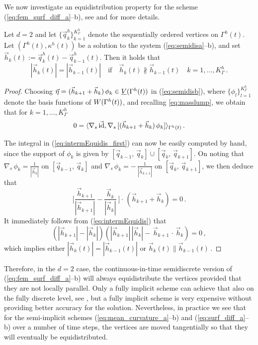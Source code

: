 We now investigate an equidistribution property for the scheme
(\ref{eq:fem_surf_diff_a}--b), see \cite[Remark~2.4]{triplej} and
\cite[Theorem~3.2]{NurnbergS14} for more details.
\begin{theorem}\label{thm:equidistribution_property}
Let $d = 2$ and let $\{ \vec q_k^h \}_{k = 1}^{K_{\Gamma}^h}$ denote the
sequentially ordered vertices on $\Gamma^h(t)$. Let
$( \Gamma^h(t), \kappa^h(t) )$
be a solution to the system (\ref{eq:semidisa}--b), and set
$\vec h_k(t) := \vec q^h_k(t) - \vec q^h_{k - 1}(t)$.
Then it holds that
\begin{equation}\label{eq:equidistribSemidis}
|\vec h_k(t)| = |\vec h_{k - 1}(t)| \quad \mbox{if} \quad
\vec h_k(t) \nparallel \vec h _{k - 1}(t) \quad k = 1, \ldots, K_{\Gamma}^h \, .
\end{equation}
\end{theorem}
\begin{proof}
Choosing $\vec \eta = (\vec h_{k + 1} + \vec h_k) \, \phi_k \in \underline{V}(\Gamma^h(t))$ in
(\ref{eq:semidisb}), where $\{ \phi_l \}_{l = 1}^{K_{\Gamma}^h}$ denote the
basis functions of $W(\Gamma^h(t))$, and recalling \ref{eq:masslump}, we obtain that for
$k = 1,\ldots,K_{\Gamma}^h$
\begin{equation}\label{eq:intermEquidis_first}
0 = \langle \nabla_s \, \vec {\rm id}, \nabla_s \, [ (\vec h_{k + 1} + \vec h_k)
\, \phi_k ] \rangle_{\Gamma^h(t)}\, .
\end{equation}

The integral in (\ref{eq:intermEquidis_first}) can now be easily computed by
hand, since the support of $\phi_k$ is given by $[\vec q_{k - 1}, \, \vec q_k]
\cup [\vec q_k, \, \vec q_{k + 1}]$. On noting that
$\nabla_s \, \phi_k = \frac{1}{|\vec h_k|}$ on $[\vec q_{k - 1}, \, \vec q_k]$
and $\nabla_s \, \phi_k = - \, \frac{1}{|\vec h_{k + 1}|}$ on $[\vec q_k, \,
\vec q_{k + 1}]$, we then deduce that
\begin{equation}\label{eq:intermEquidis}
\Big [ \frac{\vec h_{k + 1}}{|\vec h_{k + 1}|} -\frac{\vec h_k}{|\vec h_k|}
\ \Big ] \cdot \, (\vec h_{k + 1} + \vec h_k) = 0 \, .
\end{equation}
It immediately follows from (\ref{eq:intermEquidis}) that
\begin{equation}\label{eq:TM}
(|\vec h_{k + 1}| - |\vec h_k|) (|\vec h_{k + 1}| \, |\vec h_k|
- \, \vec h_{k + 1} \, \cdot \, \vec h_k) = 0 \, ,
\end{equation}
which implies either $|\vec h_k(t)| = |\vec h_{k - 1}(t)| $ or
$\vec h_k(t) \parallel \vec h _{k - 1}(t)\,.$
\end{proof}
Therefore, in the $d=2$ case, the continuous-in-time semidiscrete version of
(\ref{eq:fem_surf_diff_a}--b) will always equidistribute the vertices provided
that they are not locally parallel. Only a fully implicit scheme can achieve
that also on the fully discrete level, see \cite{fdfi}, but a fully implicit
scheme is very expensive without providing better accuracy for the solution.
Nevertheless, in practice we see that for the semi-implicit schemes
(\ref{eq:mean_curvature_a}--b) and (\ref{eq:surf_diff_a}--b) over a number of
time steps, the vertices are moved tangentially so that they will eventually be
equidistributed.

